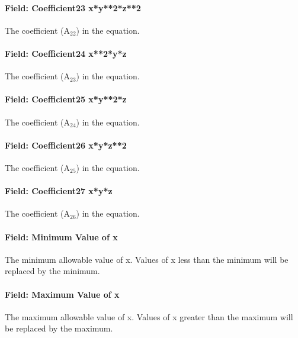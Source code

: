 \paragraph{Field: Coefficient23 x*y**2*z**2}\label{field-coefficient23-xy2z2}

The coefficient (A\(_{22}\)) in the equation.

\paragraph{Field: Coefficient24 x**2*y*z}\label{field-coefficient24-x2yz}

The coefficient (A\(_{23}\)) in the equation.

\paragraph{Field: Coefficient25 x*y**2*z}\label{field-coefficient25-xy2z}

The coefficient (A\(_{24}\)) in the equation.

\paragraph{Field: Coefficient26 x*y*z**2}\label{field-coefficient26-xyz2}

The coefficient (A\(_{25}\)) in the equation.

\paragraph{Field: Coefficient27 x*y*z}\label{field-coefficient27-xyz}

The coefficient (A\(_{26}\)) in the equation.

\paragraph{Field: Minimum Value of x}\label{field-minimum-value-of-x-11}

The minimum allowable value of x. Values of x less than the minimum will be replaced by the minimum.

\paragraph{Field: Maximum Value of x}\label{field-maximum-value-of-x-12}

The maximum allowable value of x. Values of x greater than the maximum will be replaced by the maximum.


